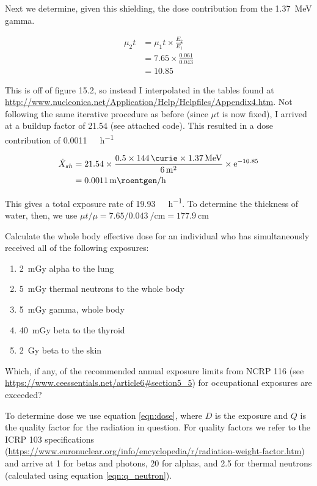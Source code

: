 \documentclass{hw}
\begin{document}
Next we determine, given this shielding, the dose contribution from the 
\SI{1.37}{\mega\electronvolt} gamma.

\begin{align*}
    \mu_2 t &= \mu_1 t \times \frac{E_2}{E_1} \\
    &= 7.65 \times \frac{0.061}{0.043} \\
    &= 10.85
\end{align*}

This is off of figure 15.2, so instead I interpolated in the tables found at 
\url{http://www.nucleonica.net/Application/Help/Helpfiles/Appendix4.htm}. 
Not following the same iterative procedure as before (since $\mu t$ is now 
fixed), I arrived at a buildup factor of \num{21.54} (see attached code). This 
resulted in a dose contribution of \SI{0.0011}{\milli\roentgen\per\hour}

\begin{align*}
    \dot{X}_{sh} &= \num{21.54} \times \frac{0.5 \times \SI{144}{\curie} \times 
    \SI{1.37}{\mega\electronvolt}}{\SI{6}{\meter}^2} \times 
    \mathrm{e}^{-10.85} \\
    &= \SI{0.0011}{\milli\roentgen\per\hour}
\end{align*}

This gives a total exposure rate of \SI{19.93}{\milli\roentgen\per\hour}. To 
determine the thickness of water, then, we use $\mu t / \mu = \num{7.65} / 
\SI{0.043}{\per\centi\meter} = \SI{177.9}{\centi\meter}$

\problem{}
Calculate the whole body effective dose for an individual who has 
simultaneously received all of the following exposures:
\begin{enumerate}
    \item \SI{2}{\milli\gray} alpha to the lung
    \item \SI{5}{\milli\gray} thermal neutrons to the whole body
    \item \SI{5}{\milli\gray} gamma, whole body
    \item \SI{40}{\milli\gray} beta to the thyroid
    \item \SI{2}{\gray} beta to the skin
\end{enumerate}

Which, if any, of the recommended annual exposure limits from NCRP 116 (see 
\url{https://www.ceessentials.net/article6#section5_5}) for occupational 
exposures are exceeded?

\solution
To determine dose we use equation \ref{eqn:dose}, where $D$ is the 
exposure and $Q$ is the quality factor for the radiation in question. For 
quality factors we refer to the ICRP 103 specifications 
(\url{https://www.euronuclear.org/info/encyclopedia/r/radiation-weight-factor.htm}) 
and arrive at 1 for betas and photons, 20 for alphas, and 2.5 for thermal 
neutrons (calculated using equation \ref{eqn:q_neutron}).
\end{document}
